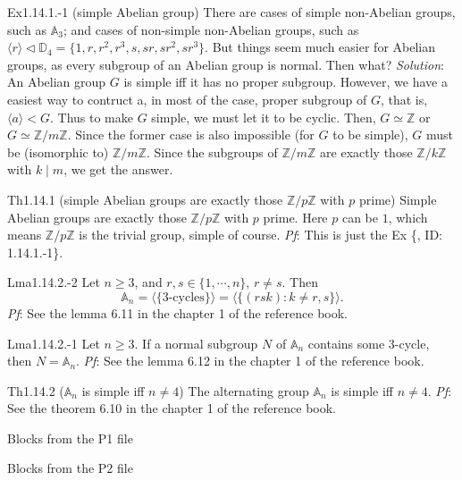 \documentclass{article}
\newcommand{\nles}{\vartriangleleft}
\begin{document}
\begin{Th}{Ex1.14.1.-1 (simple Abelian group)}
    \textcolor{Th}{There are cases of simple non-Abelian groups, such as $\mathbb{A}_3$; and cases of non-simple non-Abelian groups, such as $\langle r\rangle\nles\mathbb{D}_4 = \{1, r, r^2, r^3, s, sr, sr^2, sr^3\}$.} But things seem much easier for Abelian groups, as every subgroup of an Abelian group is normal. Then what?
    \tcblower
    \textit{Solution}: An Abelian group $G$ is simple iff it has no proper subgroup. However, we have a easiest way to contruct a, in most of the case, proper subgroup of $G$, that is, $\langle a\rangle < G$. Thus to make $G$ simple, we must let it to be cyclic. Then, $G\simeq\mathbb{Z}$ or $G\simeq\mathbb{Z}/m\mathbb{Z}$. Since the former case is also impossible (for $G$ to be simple), $G$ must be (isomorphic to) $\mathbb{Z}/m\mathbb{Z}$. Since the subgroups of $\mathbb{Z}/m\mathbb{Z}$ are exactly those $\mathbb{Z}/k\mathbb{Z}$ with $k\mid m$, we get the answer.
\end{Th}

\begin{Th}{Th1.14.1 (simple Abelian groups are exactly those $\mathbb{Z}/p\mathbb{Z}$ with $p$ prime)}
    Simple Abelian groups are exactly those $\mathbb{Z}/p\mathbb{Z}$ with $p$ prime. Here $p$ can be $1$, which means $\mathbb{Z}/p\mathbb{Z}$ is the trivial group, simple of course.
    \tcblower
    \textit{Pf}: This is just the Ex \{, ID: 1.14.1.-1\}.
\end{Th}

\begin{Th}{Lma1.14.2.-2}
    Let $n\geq 3$, and $r,s\in\{1,\cdots, n\}$, $r\neq s$. Then 
    $$ \mathbb{A}_n = \langle \{\text{3-cycles}\} \rangle = \langle \{(rsk): k\neq r,s\} \rangle. $$
    \tcblower
    \textit{Pf}: See the lemma 6.11 in the chapter 1 of the reference book.
\end{Th}

\begin{Th}{Lma1.14.2.-1}
    Let $n\geq 3$. If a normal subgroup $N$ of $\mathbb{A}_n$ contains some 3-cycle, then $N = \mathbb{A}_n$.
    \tcblower
    \textit{Pf}: See the lemma 6.12 in the chapter 1 of the reference book.
\end{Th}

\begin{Th}{Th1.14.2 ($\mathbb{A}_n$ is simple iff $n\neq 4$)}
    The alternating group $\mathbb{A}_n$ is simple iff $n\neq 4$.
    \tcblower
    \textit{Pf}: See the theorem 6.10 in the chapter 1 of the reference book.
\end{Th}

\begin{Th}{Blocks from the P1 file}
\end{Th}

\begin{Th}{Blocks from the P2 file}
\end{Th}
\end{document}
